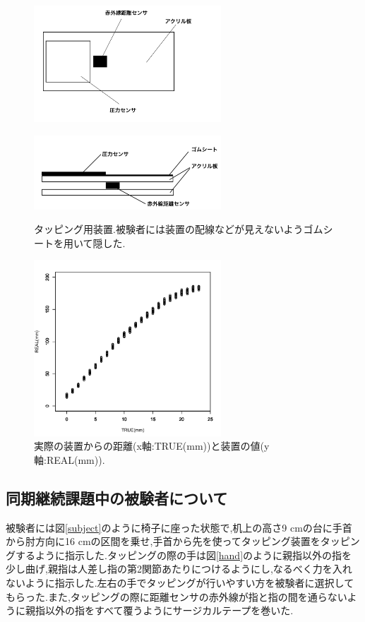 \documentclass[12pt]{jarticle}
\begin{document}
\begin{figure}[htpb]
  \begin{minipage}{\hsize}
    \centering
    \includegraphics[width=7cm]{device_up.jpg}
    \label{device_up}
  \end{minipage}
  \begin{minipage}{\hsize}
    \centering
    \includegraphics[width=7cm]{device_side.jpg}
    \label{device_side}
  \end{minipage}
  \caption{タッピング用装置.被験者には装置の配線などが見えないようゴムシートを用いて隠した.}
  \label{device}
\end{figure}

\begin{figure}
  \centering
  \includegraphics[width=7cm]{distance_true.jpg}
  \caption{実際の装置からの距離(x軸:TRUE(mm))と装置の値(y軸:REAL(mm)).}
  \label{distance_true}
\end{figure}

\subsection{同期継続課題中の被験者について}
被験者には図\ref{subject}のように椅子に座った状態で,机上の高さ9 cmの台に手首から肘方向に16 cmの区間を乗せ,手首から先を使ってタッピング装置をタッピングするように指示した.タッピングの際の手は図\ref{hand}のように親指以外の指を少し曲げ,親指は人差し指の第2関節あたりにつけるようにし,なるべく力を入れないように指示した.左右の手でタッピングが行いやすい方を被験者に選択してもらった.また,タッピングの際に距離センサの赤外線が指と指の間を通らないように親指以外の指をすべて覆うようにサージカルテープを巻いた.
\end{document}
